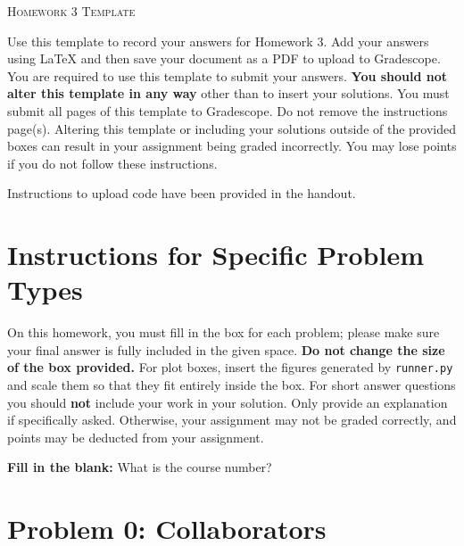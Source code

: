 \documentclass[12pt]{article}
\newcommand{\inlinebox}[2]{%
  \tcbox[colback=white, colframe=black, sharp corners, boxrule=0.4mm,
         nobeforeafter, box align=center, width=#1, height=0.75cm,
         left=2pt, right=2pt, top=1pt, bottom=1pt, tcbox width=forced center]{#2}}
\begin{document}
\begin{center}
  {\huge\textsc{Homework 3 Template}}
\end{center}
\vspace{6pt}

Use this template to record your answers for Homework 3. Add your answers using \LaTeX{} and
then save your document as a PDF to upload to Gradescope. You are required to use this
template to submit your answers. \textbf{You should not alter this template in any way} other
than to insert your solutions. You must submit all \pageref{LastPage} pages of this template to Gradescope.
Do not remove the instructions page(s). Altering this template or including your solutions
outside of the provided boxes can result in your assignment being graded incorrectly. You
may lose points if you do not follow these instructions.

Instructions to upload code have been provided in the handout.

\section*{Instructions for Specific Problem Types}

On this homework, you must fill in the box for each problem; please make sure your final
answer is fully included in the given space. \textbf{Do not change the size of the box provided.}
For plot boxes, insert the figures generated by \texttt{runner.py} and scale them so that they
fit entirely inside the box. For short answer questions you should \textbf{not} include your
work in your solution. Only provide an explanation if specifically asked. Otherwise, your
assignment may not be graded correctly, and points may be deducted from your assignment.

\hspace{1.5em}\textbf{Fill in the blank:} What is the course number?

\hspace{1.5em}\inlinebox{3cm}{%
10-703
}

\clearpage
\section*{Problem 0: Collaborators}
\end{document}
